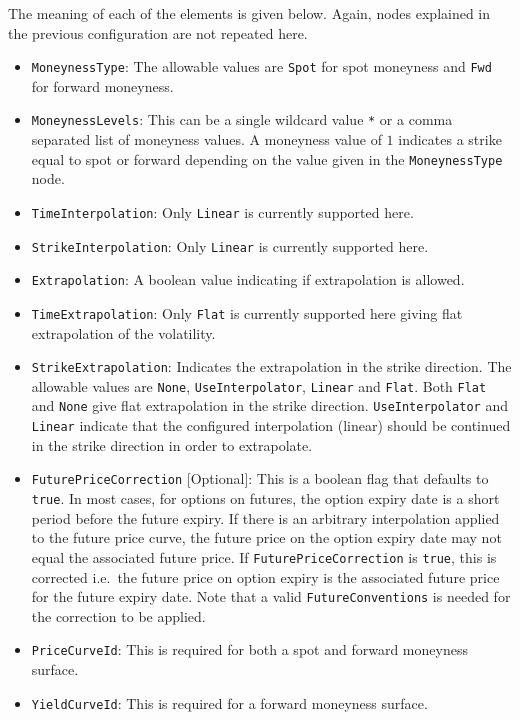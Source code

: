 The meaning of each of the elements is given below. Again, nodes explained in the previous configuration are not repeated here.
\begin{itemize}
\item \lstinline!MoneynessType!:
The allowable values are \lstinline!Spot! for spot moneyness and \lstinline!Fwd! for forward moneyness.

\item \lstinline!MoneynessLevels!:
This can be a single wildcard value \lstinline!*! or a comma separated list of moneyness values. A moneyness value of $1$ indicates a strike equal to spot or forward depending on the value given in the \lstinline!MoneynessType! node.

\item \lstinline!TimeInterpolation!:
Only \lstinline!Linear! is currently supported here.

\item \lstinline!StrikeInterpolation!:
Only \lstinline!Linear! is currently supported here.

\item \lstinline!Extrapolation!:
A boolean value indicating if extrapolation is allowed.

\item \lstinline!TimeExtrapolation!:
Only \lstinline!Flat! is currently supported here giving flat extrapolation of the volatility.

\item \lstinline!StrikeExtrapolation!:
Indicates the extrapolation in the strike direction. The allowable values are \lstinline!None!, \lstinline!UseInterpolator!, \lstinline!Linear! and \lstinline!Flat!. Both \lstinline!Flat! and \lstinline!None! give flat extrapolation in the strike direction. \lstinline!UseInterpolator! and \lstinline!Linear! indicate that the configured interpolation (linear) should be continued in the strike direction in order to extrapolate.

\item \lstinline!FuturePriceCorrection! [Optional]:
This is a boolean flag that defaults to \lstinline!true!. In most cases, for options on futures, the option expiry date is a short period before the future expiry. If there is an arbitrary interpolation applied to the future price curve, the future price on the option expiry date may not equal the associated future price. If \lstinline!FuturePriceCorrection! is \lstinline!true!, this is corrected i.e.\ the future price on option expiry is the associated future price for the future expiry date. Note that a valid \lstinline!FutureConventions! is needed for the correction to be applied.

\item \lstinline!PriceCurveId!:
This is required for both a spot and forward moneyness surface.

\item \lstinline!YieldCurveId!:
This is required for a forward moneyness surface.

\end{itemize}

